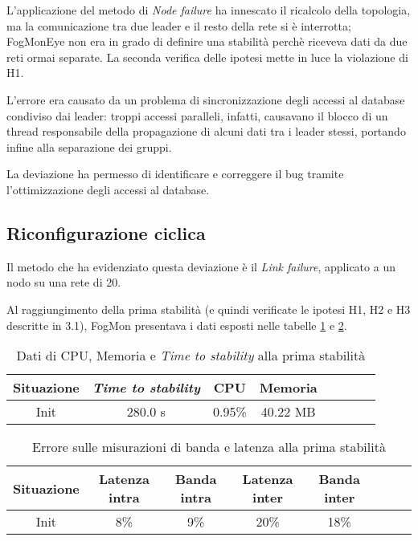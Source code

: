         L'applicazione del metodo di \textit{Node failure} ha innescato il ricalcolo della topologia, ma la comunicazione tra due leader e il resto della rete si è interrotta; FogMonEye non era in grado di definire una stabilità perchè riceveva dati da due reti ormai separate. La seconda verifica delle ipotesi mette in luce la violazione di H1.
        
        L'errore era causato da un problema di sincronizzazione degli accessi al database condiviso dai leader: troppi accessi paralleli, infatti, causavano il blocco di un thread responsabile della propagazione di alcuni dati tra i leader stessi, portando infine alla separazione dei gruppi. 
        
        La deviazione ha permesso di identificare e correggere il bug tramite l'ottimizzazione degli accessi al database.
        \subsection{Riconfigurazione ciclica}
        Il metodo che ha evidenziato questa deviazione è il \textit{Link failure}, applicato a un nodo su una rete di 20.
        
        Al raggiungimento della prima stabilità (e quindi verificate le ipotesi H1, H2 e H3 descritte in 3.1), FogMon presentava i dati esposti nelle tabelle \ref{tab:reconfig} e \ref{tab:reconfigqos}.
        
        \begin{table}[H]
            \begin{center}
            \caption{Dati di CPU, Memoria e \textit{Time to stability} alla prima stabilità}
            \label{tab:reconfig}
                \begin{tabular}{|c|c|c|c|c|c|c|c|}
                    \hline
                    Situazione & \textit{Time to stability} & CPU & Memoria\\
                    \hline
                    Init & 280.0 s & 0.95\% & 40.22 MB\\
                    \hline
                \end{tabular}
            \end{center}
        \end{table}
        
        \begin{table}[H]
            \begin{center}
            \caption{Errore sulle misurazioni di banda e latenza alla prima stabilità}
            \label{tab:reconfigqos}
                \begin{tabular}{|c|c|c|c|c|c|c|c|}
                    \hline
                    Situazione & Latenza intra & Banda intra & Latenza inter & Banda inter\\
                    \hline
                    Init & 8\% &  9\%  &  20\% &  18\%\\
                    \hline
                \end{tabular}
            \end{center}
        \end{table}
        
